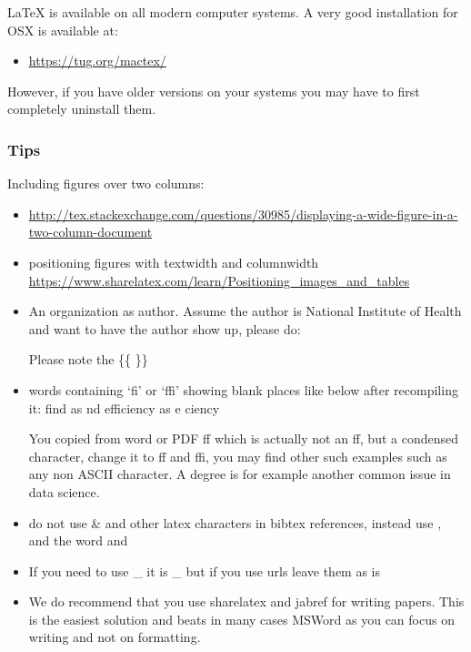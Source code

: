 LaTeX is available on all modern computer systems. A very good
installation for OSX is available at:
\begin{itemize}
\item {} 
\url{https://tug.org/mactex/}

\end{itemize}

However, if you have older versions on your systems you may have to
first completely uninstall them.


\subsubsection{Tips}
\label{\detokenize{lesson/doc/latex:tips}}
Including figures over two columns:
\begin{itemize}
\item {} 
\url{http://tex.stackexchange.com/questions/30985/displaying-a-wide-figure-in-a-two-column-document}

\item {} 
positioning figures with textwidth and columnwidth
\url{https://www.sharelatex.com/learn/Positioning\_images\_and\_tables}

\item {} 
An organization as author. Assume the author is National Institute
of Health and want  to have the author show up, please do:

\begin{sphinxVerbatim}[commandchars=\\\{\}]
    
    
\end{sphinxVerbatim}

Please note the \{\{ \}\}

\item {} 
words containing `fi' or `ffi' showing blank places like below after recompiling it:
find as  nd efficiency as e   ciency

You copied from word or PDF ff which is actually not an ff, but a
condensed character, change it to ff and ffi, you may find other
such examples such as any non ASCII character. A degree is for
example another common issue in data science.

\item {} 
do not use \textbar{} \& and other latex characters in bibtex references,
instead use , and the word and

\item {} 
If you need to use \_ it is \_ but if you use urls leave them as is

\item {} 
We do recommend that you use sharelatex and jabref for writing
papers. This is the easiest solution and beats in many cases MSWord
as you can focus on writing and not on formatting.

\end{itemize}


